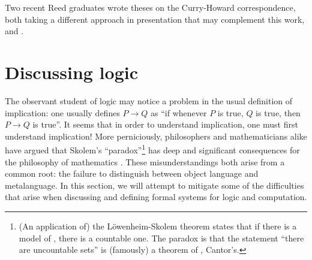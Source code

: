 \documentclass[./thesis.tex]{subfiles}
\begin{document}
Two recent Reed graduates wrote theses on the Curry-Howard correspondence, both
taking a different approach in presentation that may complement this work,
\cite{curry-howard-reed-thesis} and \cite{process-calculi-reed-thesis}.


\section{Discussing logic}
\label{sec:discussing-logic}

The observant student of logic may notice a problem in the usual definition of
implication: one usually defines $P→ Q$ as ``if whenever $P$ is true,
$Q$ is true, then $P→ Q$ is true''. It seems that in order to understand
implication, one must first understand implication! More perniciously,
philosophers and mathematicians alike have argued that Skolem's
``paradox''\footnote{(An application of) the L\"owenheim-Skolem theorem states
  that if there is a model of \ZFC, there is a countable one.
  The paradox is that the statement ``there are uncountable sets'' is (famously)
  a theorem of \ZFC, Cantor's.}
has deep and significant consequences for the philosophy of
mathematics \cite{skolem}. These misunderstandings both arise from a common
root: the failure to distinguish between object language and metalanguage. In
this section, we will attempt to mitigate some of the difficulties that arise
when discussing and defining formal systems for logic and computation.

\end{document}
